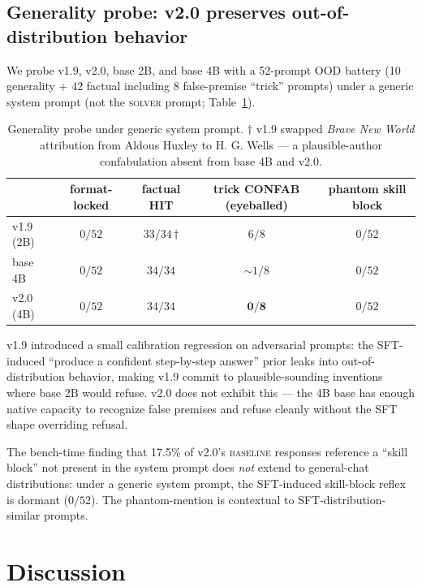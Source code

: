 \documentclass[10pt]{article}
\newcommand{\BL}{\textsc{baseline}\xspace}
\begin{document}
\subsection{Generality probe: v2.0 preserves out-of-distribution behavior}
We probe v1.9, v2.0, base 2B, and base 4B with a 52-prompt OOD battery (10 generality + 42 factual including 8 false-premise ``trick'' prompts) under a generic system prompt (not the \textsc{solver} prompt; Table~\ref{tab:generality}).

\begin{table}[h]
\centering
\small
\begin{tabular}{@{}lcccc@{}}
\toprule
& format-locked & factual HIT & trick CONFAB (eyeballed) & phantom skill block \\
\midrule
v1.9 (2B) & $0/52$ & $33/34$\,$\dagger$ & $6/8$ & $0/52$ \\
base 4B   & $0/52$ & $34/34$ & $\sim\!1/8$ & $0/52$ \\
v2.0 (4B) & $0/52$ & $34/34$ & $\mathbf{0/8}$ & $0/52$ \\
\bottomrule
\end{tabular}
\caption{Generality probe under generic system prompt. $\dagger$ v1.9 swapped \emph{Brave New World} attribution from Aldous Huxley to H. G. Wells --- a plausible-author confabulation absent from base 4B and v2.0.}
\label{tab:generality}
\end{table}

v1.9 introduced a small calibration regression on adversarial prompts: the SFT-induced ``produce a confident step-by-step answer'' prior leaks into out-of-distribution behavior, making v1.9 commit to plausible-sounding inventions where base 2B would refuse. v2.0 does not exhibit this --- the 4B base has enough native capacity to recognize false premises and refuse cleanly without the SFT shape overriding refusal.

The bench-time finding that 17.5\% of v2.0's \BL{} responses reference a ``skill block'' not present in the system prompt does \emph{not} extend to general-chat distributions: under a generic system prompt, the SFT-induced skill-block reflex is dormant ($0/52$). The phantom-mention is contextual to SFT-distribution-similar prompts.

\section{Discussion}
\end{document}

